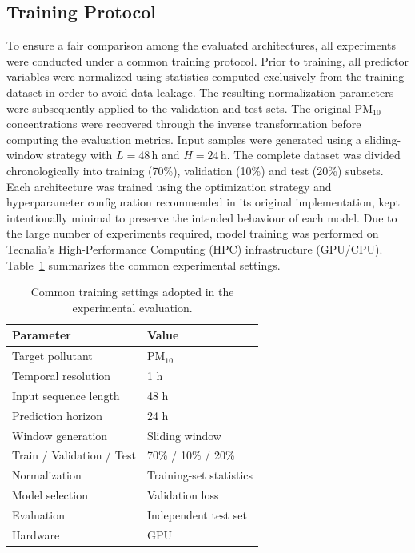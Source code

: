 \documentclass[11pt]{article}
\begin{document}
\subsection{Training Protocol}
To ensure a fair comparison among the evaluated architectures, all experiments were conducted under a common training protocol. Prior to training, all predictor variables were normalized using statistics computed exclusively from the training dataset in order to avoid data leakage. The resulting normalization parameters were subsequently applied to the validation and test sets. The original PM$_{10}$ concentrations were recovered through the inverse transformation before computing the evaluation metrics. Input samples were generated using a sliding-window strategy with $L{=}48$\,h and $H{=}24$\,h. The complete dataset was divided chronologically into training (70\%), validation (10\%) and test (20\%) subsets. Each architecture was trained using the optimization strategy and hyperparameter configuration recommended in its original implementation, kept intentionally minimal to preserve the intended behaviour of each model. Due to the large number of experiments required, model training was performed on Tecnalia's High-Performance Computing (HPC) infrastructure (GPU/CPU). Table~\ref{tab:training} summarizes the common experimental settings.

\begin{table}[ht]
\centering
\caption{Common training settings adopted in the experimental evaluation.}
\label{tab:training}
\renewcommand{\arraystretch}{1.15}
\begin{tabular}{ll}
\toprule
\textbf{Parameter} & \textbf{Value} \\
\midrule
Target pollutant & PM$_{10}$ \\
Temporal resolution & 1 h \\
Input sequence length & 48 h \\
Prediction horizon & 24 h \\
Window generation & Sliding window \\
Train / Validation / Test & 70\% / 10\% / 20\% \\
Normalization & Training-set statistics \\
Model selection & Validation loss \\
Evaluation & Independent test set \\
Hardware & GPU \\
\bottomrule
\end{tabular}
\end{table}
\end{document}
